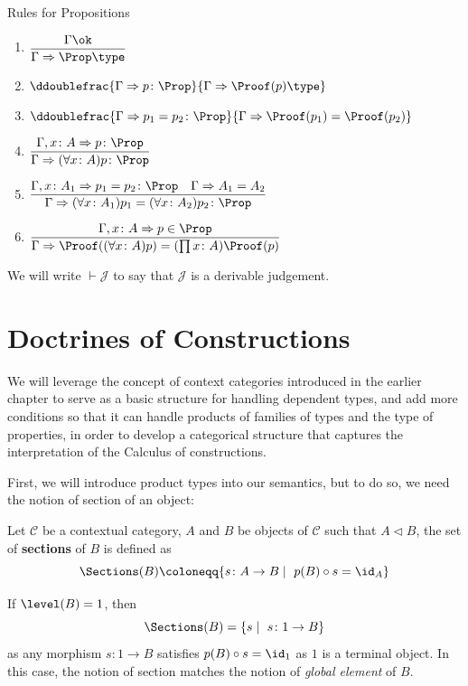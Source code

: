 Rules for Propositions

\begin{enumerate}
    \item[\textsc{Prop}] $\dfrac{
        \Gamma \ok
    }{
        \Gamma \Rightarrow \Prop \type
    }$ 
    \item[\textsc{Prop-Type}] $\ddoublefrac{
        \Gamma \Rightarrow p \colon \Prop
    }{
        \Gamma \Rightarrow \Proof(p) \type
    }$
    \item[\textsc{Prop-Equ}] $\ddoublefrac{
        \Gamma \Rightarrow p_1 = p_2 \colon \Prop
    }{
        \Gamma \Rightarrow \Proof(p_1) = \Proof(p_2)
    }$
    \item[\textsc{$\forall$-Intro}] $\dfrac{
        \Gamma, x \colon A 
        \Rightarrow
        p \colon \Prop
    }{
        \Gamma
        \Rightarrow
        (\forall x \colon A) p 
        \colon \Prop
    }$
    \item[\textsc{$\forall$-Equ}] $\dfrac{
        \Gamma, x \colon A_1 \Rightarrow p_1 = p_2 \colon \Prop
        \quad
        \Gamma \Rightarrow A_1 = A_2
    }{
        \Gamma
        \Rightarrow
        (\forall x \colon A_1) p_1
        =
        (\forall x \colon A_2) p_2 
        \colon
        \Prop
    }$
    \item[\textsc{$\forall$-Elim}] $\dfrac{
        \Gamma, x \colon A \Rightarrow p \in \Prop
    }{
        \Gamma 
        \Rightarrow
        \Proof((\forall x \colon A) p)
        = 
        (\prod x \colon A) \Proof(p)
    }$
\end{enumerate}

We will write $\vdash \mathcal{J}$ to say that $\mathcal{J}$ is a derivable judgement.

\section{Doctrines of Constructions}

We will leverage the concept of context categories introduced in the earlier chapter
to serve as a basic structure for handling dependent types, and add more conditions
so that it can handle products of families of types and the type of properties, in
order to develop a categorical structure that captures the interpretation of the
Calculus of constructions.

First, we will introduce product types into our semantics, but to do so, we need
the notion of section of an object:
\begin{definition}
    Let $\mathcal{C}$ be a contextual category, $A$ and $B$ be objects of $\mathcal{C}$ such that $A \lhd B$,
    the set of \textbf{sections} of $B$ is defined as 
    \begin{equation*}
        \Sections(B) \coloneqq \{ s \colon A \to B  \mid\ p(B) \circ s = \id_A\}
    \end{equation*}
\end{definition}
If $\level(B) = 1$, then 
\[
    \Sections(B) = \{ s \mid\ s \colon 1 \to B \}
\]
as any morphism $s \colon 1 \to B$ satisfies $p(B) \circ s = \id_1$ as 
$1$ is a terminal object. In this case, the notion of section
matches the notion of \textit{global element} of $B$.

